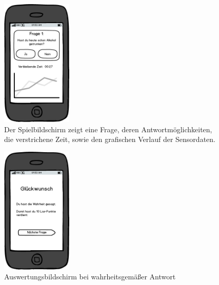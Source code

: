 \documentclass[10pt, a4paper, oneside, titlepage]{scrartcl} %
\begin{document}
	\newpage
	\begin{figure}[ht!]
		\begin{center}
			\includegraphics[width=0.3\textwidth]{mockup_03_playgame.png}
		\end{center}
		\caption[Mockup Spielbildschirm]{Der Spielbildschirm zeigt eine Frage, deren Antwortmöglichkeiten, die verstrichene Zeit, sowie den grafischen Verlauf der Sensordaten.}
		\label{fig:mockup_03}
	\end{figure}	
	\begin{figure}[h!]
		\begin{center}
			\includegraphics[width=0.3\textwidth]{mockup_04_score.png}
		\end{center}
		\caption[Mockup Bildschirm Fragenauswertung Wahrheit]{Auswertungsbildschirm bei wahrheitsgemäßer Antwort}
		\label{fig:mockup_04}
	\end{figure}	
\end{document}
